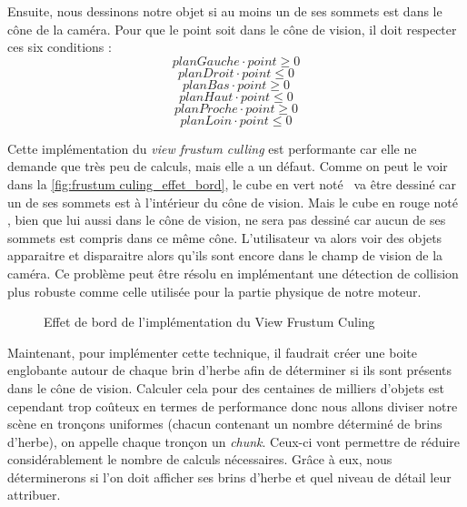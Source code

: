 Ensuite, nous dessinons notre objet si au moins un de ses sommets est dans le cône de la caméra. Pour que le point soit dans le cône de vision, il doit respecter ces six conditions :
\[planGauche \cdot point \geqslant 0\]
\[planDroit \cdot point \leqslant 0\]
\[planBas \cdot point \geqslant 0\]
\[planHaut \cdot point \leqslant 0\]
\[planProche \cdot point \geqslant 0\]
\[planLoin \cdot point \leqslant 0\]

Cette implémentation du \textit{view frustum culling} est performante car elle ne demande que très peu de calculs, mais elle a un défaut. Comme on peut le voir dans la \autoref{fig:frustum culing_effet_bord}, le cube en vert noté \fg \ va être dessiné car un de ses sommets est à l'intérieur du cône de vision. Mais le cube en rouge noté \fg, bien que lui aussi dans le cône de vision, ne sera pas dessiné car aucun de ses sommets est compris dans ce même cône. L'utilisateur va alors voir des objets apparaitre et disparaitre alors qu'ils sont encore dans le champ de vision de la caméra. Ce problème peut être résolu en implémentant une détection de collision plus robuste comme celle utilisée pour la partie physique de notre moteur.

\begin{figure}[H]
	\begin{center}
	\end{center}
	\caption{Effet de bord de l'implémentation du \og View Frustum Culing\fg}
	\label{fig:frustum culing_effet_bord}
\end{figure}

Maintenant, pour implémenter cette technique, il faudrait créer une boite englobante autour de chaque brin d'herbe afin de déterminer si ils sont présents dans le cône de vision. Calculer cela pour des centaines de milliers d'objets est cependant trop coûteux en termes de performance donc nous allons diviser notre scène en tronçons uniformes (chacun contenant un nombre déterminé de brins d'herbe), on appelle chaque tronçon un \textit{chunk}. Ceux-ci vont permettre de réduire considérablement le nombre de calculs nécessaires. Grâce à eux, nous déterminerons si l'on doit afficher ses brins d'herbe et quel niveau de détail leur attribuer.


